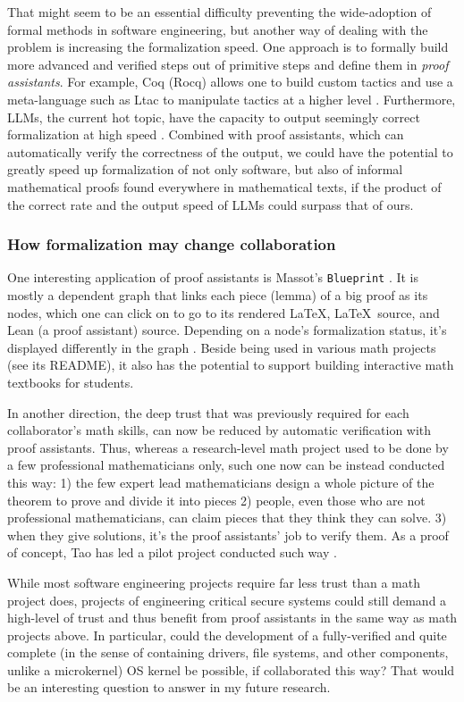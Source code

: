 \documentclass[10pt]{article}
\begin{document}
That might seem to be an essential difficulty preventing the wide-adoption of
formal methods in software engineering, but another way of dealing with the
problem is increasing the formalization speed. One approach is to formally build
more advanced and verified steps out of primitive steps and define them in
\emph{proof assistants}. For example, Coq (Rocq) allows one to build custom
tactics and use a meta-language such as Ltac to manipulate tactics at a higher
level \cite{coq.manual}. Furthermore, LLMs, the current hot topic, have the
capacity to output seemingly correct formalization at high speed
\cite{llm.gen.proof}.  Combined with proof assistants, which can automatically
verify the correctness of the output, we could have the potential to greatly
speed up formalization of not only software, but also of informal mathematical
proofs found everywhere in mathematical texts, if the product of the correct
rate and the output speed of LLMs could surpass that of ours.

\subsubsection{How formalization may change collaboration}
One interesting application of proof assistants is Massot's \texttt{Blueprint}
\cite{massot.blueprint}. It is mostly a dependent graph that links each piece
(lemma) of a big proof as its nodes, which one can click on to go to its
rendered \LaTeX, \LaTeX\ source, and Lean (a proof assistant) source. Depending
on a node's formalization status, it's displayed differently in the graph
\cite{tao.blueprint.post}. Beside being used in various math projects (see its
README), it also has the potential to support building interactive math
textbooks for students.

In another direction, the deep trust that was previously required for each
collaborator's math skills, can now be reduced by automatic verification with
proof assistants. Thus, whereas a research-level math project used to be done
by a few professional mathematicians only, such one now can be instead
conducted this way: 1) the few expert lead mathematicians design a whole picture
of the theorem to prove and divide it into pieces 2) people, even those who are
not professional mathematicians, can claim pieces that they think they can
solve. 3) when they give solutions, it's the proof assistants' job to verify
them. As a proof of concept, Tao has led a pilot project conducted such way
\cite{tao.pilot.project}.

While most software engineering projects require far less trust than a
math project does, projects of engineering critical secure systems could
still demand a high-level of trust and thus benefit from proof assistants in
the same way as math projects above. In particular, could the development of a
fully-verified and quite complete (in the sense of containing drivers, file
systems, and other components, unlike a microkernel) OS kernel be possible, if
collaborated this way? That would be an interesting question to answer in my
future research.
\end{document}
